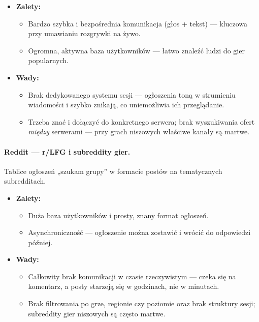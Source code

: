 \begin{itemize}
  \item \textbf{Zalety:}
  \begin{itemize}
    \item Bardzo szybka i bezpośrednia komunikacja (głos + tekst) — kluczowa przy
          umawianiu rozgrywki na żywo.
    \item Ogromna, aktywna baza użytkowników — łatwo znaleźć ludzi do gier popularnych.
  \end{itemize}
  \item \textbf{Wady:}
  \begin{itemize}
    \item Brak dedykowanego systemu sesji — ogłoszenia toną w strumieniu wiadomości i
          szybko znikają, co uniemożliwia ich przeglądanie.
    \item Trzeba znać i dołączyć do konkretnego serwera; brak wyszukiwania ofert
          \emph{między} serwerami — przy grach niszowych właściwe kanały są martwe.
  \end{itemize}
\end{itemize}

\paragraph{Reddit — r/LFG i subreddity gier.}
Tablice ogłoszeń „szukam grupy” w formacie postów na tematycznych subredditach.

\begin{itemize}
  \item \textbf{Zalety:}
  \begin{itemize}
    \item Duża baza użytkowników i prosty, znany format ogłoszeń.
    \item Asynchroniczność — ogłoszenie można zostawić i wrócić do odpowiedzi później.
  \end{itemize}
  \item \textbf{Wady:}
  \begin{itemize}
    \item Całkowity brak komunikacji w czasie rzeczywistym — czeka się na komentarz,
          a posty starzeją się w godzinach, nie w minutach.
    \item Brak filtrowania po grze, regionie czy poziomie oraz brak struktury sesji;
          subreddity gier niszowych są często martwe.
  \end{itemize}
\end{itemize}

